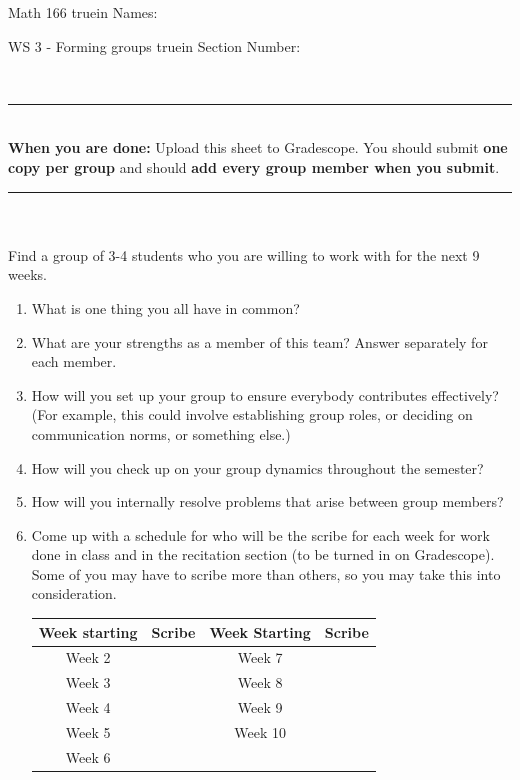\documentclass[12pt]{article}
\begin{document}
\pagestyle{empty} %

\noindent
{Math 166    truein  Names:\ \hrulefill}

\noindent
{WS 3 - Forming groups   truein  Section Number:\ \hrulefill}

\ \\
\hrule\ \\
\noindent
\noindent
\textbf{When you are done:} Upload this sheet to Gradescope.
You should submit \textbf{one copy per group} and should \textbf{add every group member when you submit}.
\hrule\ \\
\\
\noindent
Find a group of 3-4 students who you are willing to work with for the next 9 weeks.
\begin{enumerate}
\item What is one thing you all have in common?
\vfill
\item What are your strengths as a member of this team?  Answer separately for each member.
\vfill
\vfill
\item How will you set up your group to ensure everybody contributes effectively?  (For example, this could involve establishing group roles, or deciding on communication norms, or something else.)
\vfill
\item How will you check up on your group dynamics throughout the semester?
\vfill
\item How will you internally resolve problems that arise between group members?
\vfill
\item Come up with a schedule for who will be the scribe for each week for work done in class and in the recitation section (to be turned in on Gradescope). Some of you may have to scribe more than others, so you may take this into consideration.
\vfill
\begin{center}
\begin{tabular}{|c|c|c|c|}
	\hline
	Week starting & Scribe & Week Starting & Scribe \\ \hline
	Week 2 & \hspace{1.5 in} & Week 7 & \hspace{1.5 in} \\ \hline
	Week 3 & & Week 8 & \\ \hline
	Week 4 & & Week 9 & \\ \hline
	Week 5 & & Week 10 & \\ \hline
	Week 6 & & & \\ \hline
\end{tabular}
\end{center}
\vfill
\end{enumerate}
\end{document}
